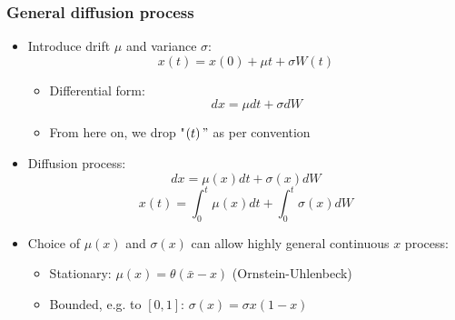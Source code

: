 \documentclass[bigger,handout]{beamer}
\begin{document}
\begin{frame}%
\frametitle{General diffusion process}

\begin{itemize}
\item Introduce drift $\mu $ and variance $\sigma $:%
\begin{equation*}
x\left( t\right) =x\left( 0\right) +\mu t+\sigma W\left( t\right)
\end{equation*}

\begin{itemize}
\item Differential form:
\begin{equation*}
dx=\mu dt+\sigma dW
\end{equation*}

\item From here on, we drop "$\left( t\right) "$ as per convention
\end{itemize}

\item Diffusion process:%
\begin{equation*}
dx=\mu \left( x\right) dt+\sigma \left( x\right) dW
\end{equation*}
\begin{equation*}
x(t)= \int_{0}^{t}\mu\left( x\right)dt+\int_{0}^{t}\sigma \left( x\right) dW
\end{equation*}

\item Choice of $\mu \left( x\right) $ and $\sigma \left( x\right) $ can allow highly general continuous $x$ process:

\begin{itemize}
\item Stationary: $\mu \left( x\right) =\theta \left( \bar{x}-x\right) $
(Ornstein-Uhlenbeck)

\item Bounded, e.g. to $\left[ 0,1\right] $: $\sigma \left( x\right) =\sigma
x\left( 1-x\right) $
\end{itemize}
\end{itemize}

\end{frame}%
\end{document}
